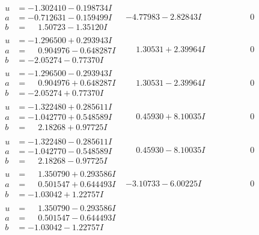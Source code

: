 \documentclass[1p]{elsarticle_modified}
\theoremstyle{definition}
\begin{document}
$$\begin{array}{c|c|c}
\begin{aligned}
u &= -1.302410 - 0.198734 I \\
a &= -0.712631 - 0.159499 I \\
b &= \phantom{-}1.50723 - 1.35120 I\end{aligned}
 & -4.77983 - 2.82843 I & \phantom{-0.000000 } 0 \\ \hline\begin{aligned}
u &= -1.296500 + 0.293943 I \\
a &= \phantom{-}0.904976 - 0.648287 I \\
b &= -2.05274 - 0.77370 I\end{aligned}
 & \phantom{-}1.30531 + 2.39964 I & \phantom{-0.000000 } 0 \\ \hline\begin{aligned}
u &= -1.296500 - 0.293943 I \\
a &= \phantom{-}0.904976 + 0.648287 I \\
b &= -2.05274 + 0.77370 I\end{aligned}
 & \phantom{-}1.30531 - 2.39964 I & \phantom{-0.000000 } 0 \\ \hline\begin{aligned}
u &= -1.322480 + 0.285611 I \\
a &= -1.042770 + 0.548589 I \\
b &= \phantom{-}2.18268 + 0.97725 I\end{aligned}
 & \phantom{-}0.45930 + 8.10035 I & \phantom{-0.000000 } 0 \\ \hline\begin{aligned}
u &= -1.322480 - 0.285611 I \\
a &= -1.042770 - 0.548589 I \\
b &= \phantom{-}2.18268 - 0.97725 I\end{aligned}
 & \phantom{-}0.45930 - 8.10035 I & \phantom{-0.000000 } 0 \\ \hline\begin{aligned}
u &= \phantom{-}1.350790 + 0.293586 I \\
a &= \phantom{-}0.501547 + 0.644493 I \\
b &= -1.03042 + 1.22757 I\end{aligned}
 & -3.10733 - 6.00225 I & \phantom{-0.000000 } 0 \\ \hline\begin{aligned}
u &= \phantom{-}1.350790 - 0.293586 I \\
a &= \phantom{-}0.501547 - 0.644493 I \\
b &= -1.03042 - 1.22757 I\end{aligned}

\end{array}$$
\end{document}
